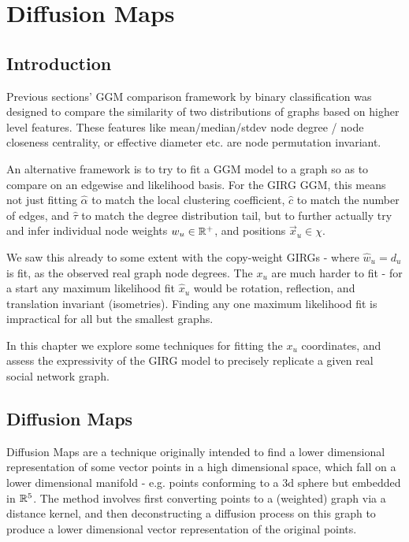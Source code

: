 \chapter{Diffusion Maps}
\minitoc
\section{Introduction}

Previous sections' GGM comparison framework by binary classification was designed to compare the similarity of two distributions of graphs based on higher level features. These features like mean/median/stdev node degree / node closeness centrality, or effective diameter etc. are node permutation invariant.

An alternative framework is to try to fit a GGM model to a graph so as to compare on an edgewise and likelihood basis. For the GIRG GGM, this means not just fitting $\hat{\alpha}$ to match the local clustering coefficient, $\hat{c}$ to match the number of edges, and $\hat{\tau}$ to match the degree distribution tail, but to further actually try and infer individual node weights $w_u \in \mathbb{R}^+$, and positions $\vec{x}_u \in \chi$. 

We saw this already to some extent with the copy-weight GIRGs - where $\hat{w}_u = d_u$ is fit, as the observed real graph node degrees. The $x_u$ are much harder to fit - for a start any maximum likelihood fit $\hat{x}_u$ would be rotation, reflection, and translation invariant (isometries). Finding any one maximum likelihood fit is impractical for all but the smallest graphs.

In this chapter we explore some techniques for fitting the $x_u$ coordinates, and assess the expressivity of the GIRG model to precisely replicate a given real social network graph.

\section{Diffusion Maps}
Diffusion Maps \cite{coifman2006diffusion} are a technique originally intended to find a lower dimensional representation of some vector points in a high dimensional space, which fall on a lower dimensional manifold - e.g. points conforming to a 3d sphere but embedded in $\mathbb{R}^5$. The method involves first converting points to a (weighted) graph via a distance kernel, and then deconstructing a diffusion process on this graph to produce a lower dimensional vector representation of the original points.

